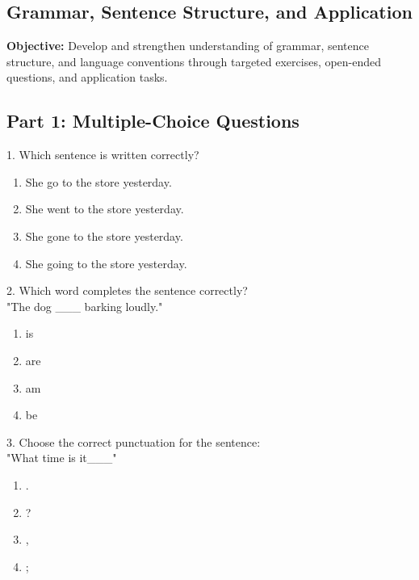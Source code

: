 \documentclass[12pt]{article}
\begin{document}
\subsection*{ Grammar, Sentence Structure, and Application}
\onehalfspacing

\begin{tcolorbox}[colframe=black!40, colback=gray!0, title=Learning Objective]
\textbf{Objective:} Develop and strengthen understanding of grammar, sentence structure, and language conventions through targeted exercises, open-ended questions, and application tasks.
\end{tcolorbox}

\subsection*{Part 1: Multiple-Choice Questions}

1. Which sentence is written correctly?
\begin{enumerate}[label=\Alph*.]
    \item She go to the store yesterday.  
    \item She went to the store yesterday.  
    \item She gone to the store yesterday.  
    \item She going to the store yesterday.  
\end{enumerate}

\vspace{1cm}

2. Which word completes the sentence correctly? \\ "The dog \_\_\_ barking loudly."
\begin{enumerate}[label=\Alph*.]
    \item is  
    \item are  
    \item am  
    \item be  
\end{enumerate}

\vspace{1cm}

3. Choose the correct punctuation for the sentence: \\ "What time is it\_\_\_"
\begin{enumerate}[label=\Alph*.]
    \item .  
    \item ?  
    \item ,  
    \item ;  
\end{enumerate}
\end{document}
